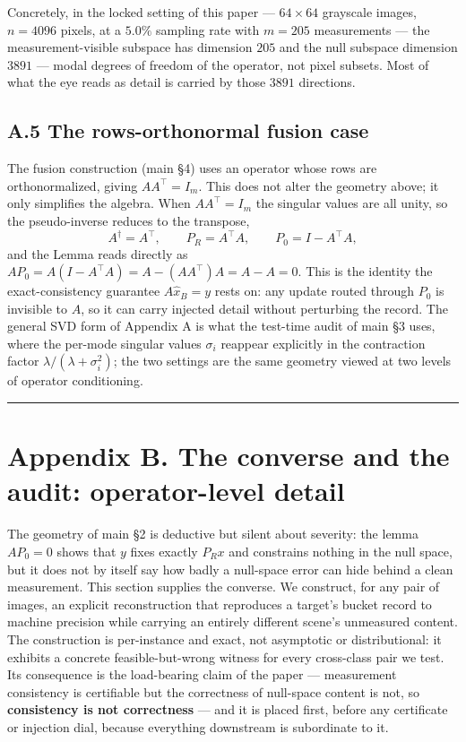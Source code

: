 \documentclass[11pt]{article}
\begin{document}
Concretely, in the locked setting of this paper --- $64 \times 64$ grayscale images, $n = 4096$ pixels, at a $5.0\%$ sampling rate with $m = 205$ measurements --- the measurement-visible subspace has dimension $205$ and the null subspace dimension $3891$ --- modal degrees of freedom of the operator, not pixel subsets. Most of what the eye reads as detail is carried by those $3891$ directions.

\subsection*{A.5 The rows-orthonormal fusion case}

The fusion construction (main §4) uses an operator whose rows are orthonormalized, giving $A A^\top = I_m$. This does not alter the geometry above; it only simplifies the algebra. When $A A^\top = I_m$ the singular values are all unity, so the pseudo-inverse reduces to the transpose,
$$A^\dagger = A^\top, \qquad P_R = A^\top A, \qquad P_0 = I - A^\top A,$$
and the Lemma reads directly as $A P_0 = A(I - A^\top A) = A - (A A^\top) A = A - A = 0$. This is the identity the exact-consistency guarantee $A \hat{x}_B = y$ rests on: any update routed through $P_0$ is invisible to $A$, so it can carry injected detail without perturbing the record. The general SVD form of Appendix A is what the test-time audit of main §3 uses, where the per-mode singular values $\sigma_i$ reappear explicitly in the contraction factor $\lambda / (\lambda + \sigma_i^2)$; the two settings are the same geometry viewed at two levels of operator conditioning.

\medskip\hrule\medskip

\section*{Appendix B. The converse and the audit: operator-level detail}


The geometry of main §2 is deductive but silent about severity: the lemma $A P_0 = 0$ shows that $y$ fixes exactly $P_R x$ and constrains nothing in the null space, but it does not by itself say how badly a null-space error can hide behind a clean measurement. This section supplies the converse. We construct, for any pair of images, an explicit reconstruction that reproduces a target's bucket record to machine precision while carrying an entirely different scene's unmeasured content. The construction is per-instance and exact, not asymptotic or distributional: it exhibits a concrete feasible-but-wrong witness for every cross-class pair we test. Its consequence is the load-bearing claim of the paper --- measurement consistency is certifiable but the correctness of null-space content is not, so \textbf{consistency is not correctness} --- and it is placed first, before any certificate or injection dial, because everything downstream is subordinate to it.
\end{document}
